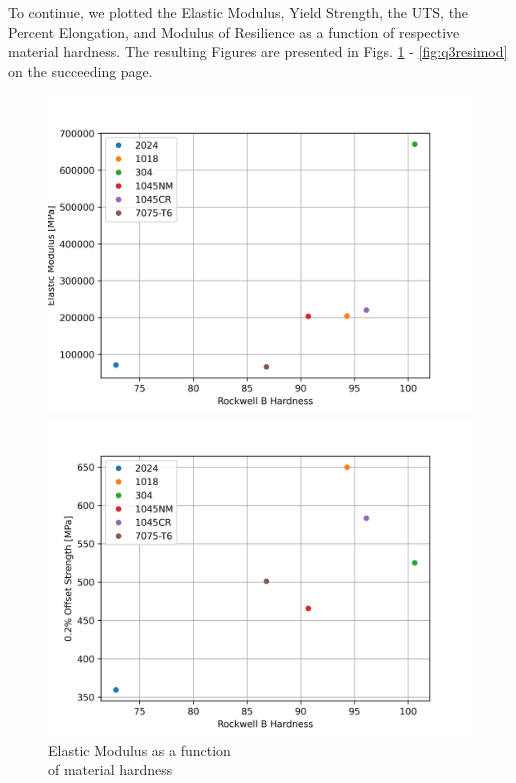 \documentclass{article}
\begin{document}
To continue, we plotted the Elastic Modulus, Yield Strength, the UTS, the Percent Elongation, and Modulus of Resilience as a function of respective material hardness. The resulting Figures are presented in Figs. \ref{figq3:elasmod} - \ref{fig:q3resimod} on the succeeding page. 
\newpage
\begin{figure}[!h!] 
  \begin{minipage}[b]{0.5\linewidth}
    \centering
    \includegraphics[width=\linewidth]{plots/q3_E.png} 
    \caption{Elastic Modulus as a function \\  of material hardness} 
    \label{figq3:elasmod}
    \vspace{4ex}
  \end{minipage}
  \begin{minipage}[b]{0.5\linewidth}
    \centering
    \includegraphics[width=\linewidth]{plots/q3_offstr.png} 

\end{minipage}
\end{figure}
\end{document}
